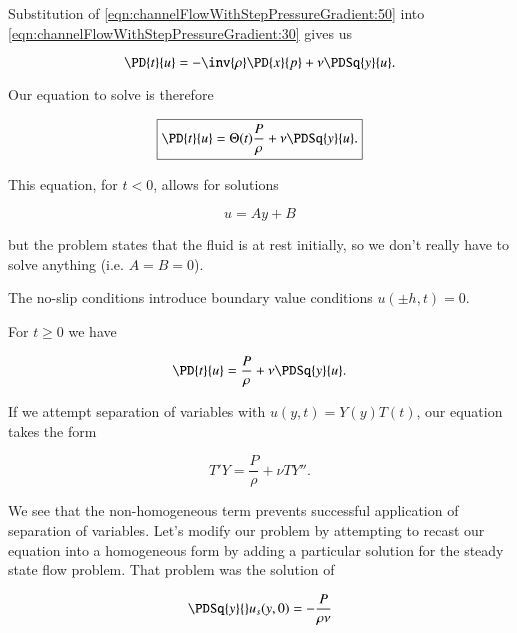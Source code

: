 Substitution of \ref{eqn:channelFlowWithStepPressureGradient:50} into \ref{eqn:channelFlowWithStepPressureGradient:30} gives us

\begin{equation}\label{eqn:channelFlowWithStepPressureGradient:70}
\PD{t}{u} = -\inv{\rho} \PD{x}{p} + \nu \PDSq{y}{u}.
\end{equation}

Our equation to solve is therefore

\begin{equation}\label{eqn:channelFlowWithStepPressureGradient:90}
\boxed{
\PD{t}{u} = \Theta(t) \frac{P}{\rho} + \nu \PDSq{y}{u}.
}
\end{equation}

This equation, for $t < 0$, allows for solutions

\begin{equation}\label{eqn:channelFlowWithStepPressureGradient:110}
u = A y + B
\end{equation}

but the problem states that the fluid is at rest initially, so we don't really have to solve anything (i.e. $A = B = 0$).

The no-slip conditions introduce boundary value conditions $u(\pm h, t) = 0$.

For $t \ge 0$ we have

\begin{equation}\label{eqn:channelFlowWithStepPressureGradient:130}
\PD{t}{u} = \frac{P}{\rho} + \nu \PDSq{y}{u}.
\end{equation}

If we attempt separation of variables with $u(y, t) = Y(y) T(t)$, our equation takes the form

\begin{equation}\label{eqn:channelFlowWithStepPressureGradient:150}
T' Y = \frac{P}{\rho} + \nu T Y''.
\end{equation}

We see that the non-homogeneous term prevents successful application of separation of variables.  Let's modify our problem by attempting to recast our equation into a homogeneous form by adding a particular solution for the steady state flow problem.  That problem was the solution of

\begin{equation}\label{eqn:channelFlowWithStepPressureGradient:170}
\PDSq{y}{} u_s(y, 0) = -\frac{P}{\rho \nu}
\end{equation}

